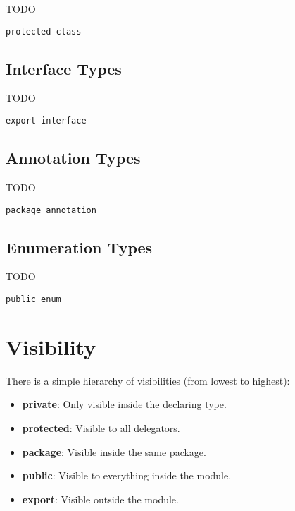 \documentclass[11pt,a4paper]{report}
\begin{document}
TODO

\begin{lstlisting}[language=CayThe, title=foo/bar/Baz.ct]
protected class
\end{lstlisting}

\subsection{Interface Types}

TODO

\begin{lstlisting}[language=CayThe, title=foo/bar/Baz.ct]
export interface 
\end{lstlisting}


\subsection{Annotation Types}

TODO

\begin{lstlisting}[language=CayThe, title=foo/bar/Baz.ct]
package annotation 
\end{lstlisting}

\subsection{Enumeration Types}

TODO

\begin{lstlisting}[language=CayThe, title=foo/bar/Baz.ct]
public enum 
\end{lstlisting}

\section{Visibility}

There is a simple hierarchy of visibilities (from lowest to highest):

\begin{itemize}
    \item \textbf{private}: Only visible inside the declaring type.
    \item \textbf{protected}: Visible to all delegators.
    \item \textbf{package}: Visible inside the same package.
    \item \textbf{public}: Visible to everything inside the module.
    \item \textbf{export}: Visible outside the module.
\end{itemize}
\end{document}
